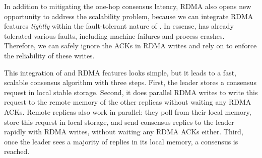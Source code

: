 

% 
In addition to mitigating the one-hop consensus latency, RDMA also opens 
new opportunity to address the \paxos scalability problem, because we
can integrate RDMA features \emph{tightly} within the fault-tolerant nature of 
\paxos. In essense, \paxos has already tolerated various faults, including 
machine failures and process crashes. Therefore, we can safely ignore the ACKs 
in RDMA writes and rely on \paxos to enforce the reliability of these writes.

This integration of \paxos and RDMA features looks simple, but it leads to 
a fast, scalable \paxos consensus algorithm with three steps. First, the leader 
stores a consensus request in local stable storage. Second, it does parallel 
RDMA writes to write this request to the remote memory of the other replicas 
without waiting any RDMA ACKs. Remote replicas also work in parallel: they poll 
from their local memory, store this request in local storage, and send 
consensus replies to the leader rapidly with RDMA writes, without waiting any 
RDMA ACKs either. Third, once the leader sees a majority of replies in its 
local memory, a consensus is reached.


